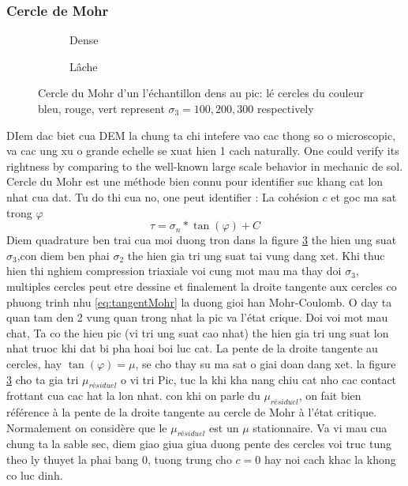 \documentclass[a4paper,12pt]{report}
\begin{document}
\subsubsection{Cercle de Mohr}
\begin{figure}[h!]
    \centering
    \begin{subfigure}[b]{0.48\textwidth}
        \centering
        \scalebox{0.6}{\small }
        \caption{Dense}
        \label{fig:palier_a}
    \end{subfigure}
    \hfill
    \begin{subfigure}[b]{0.48\textwidth}
        \centering
        \scalebox{0.7}{\small }
        \caption{Lâche}
        \label{fig:palier_b}
    \end{subfigure}
    \caption{Cercle du Mohr d'un l'échantillon dens au pic: lé cercles du couleur bleu, rouge, vert represent $\sigma_3 = 100, 200, 300$ respectively}
    \label{fig:CercleDuMohr}
\end{figure}
DIem dac biet cua DEM la chung ta chi intefere vao cac thong so o microscopic, va cac ung xu o grande echelle se xuat hien 1 cach naturally.
One could verify its rightness by comparing to the well-known large scale behavior in mechanic de sol.  
Cercle du Mohr est une méthode bien connu pour identifier suc khang cat lon nhat cua dat. Tu do thi cua no, one peut identifier : La cohésion $c$ et goc ma sat trong $\varphi$
\begin{equation}
    \tau = \sigma_n * \tan(\varphi) + C
    \label{eq:tangentMohr}
\end{equation}
Diem quadrature ben trai cua moi duong tron dans la figure \ref{fig:CercleDuMohr} the hien ung suat $\sigma_3$,con diem ben phai $\sigma_2$ the hien gia tri ung suat tai vung dang xet.
Khi thuc hien thi nghiem compression triaxiale voi cung mot mau ma thay doi $\sigma_3$, multiples cercles peut etre dessine et finalement la droite tangente aux cercles co phuong trinh nhu \ref{eq:tangentMohr} la duong gioi han Mohr-Coulomb.
O day ta quan tam den 2 vung quan trong nhat la pic va l'état crique.
Doi voi mot mau chat, Ta co the hieu pic (vi tri ung suat cao nhat) the hien gia tri ung suat lon nhat truoc khi dat bi pha hoai boi luc cat. 
La pente de la droite tangente au cercles, hay $\tan(\varphi) = \mu$, se cho thay su ma sat o giai doan dang xet. 
la figure \ref{fig:CercleDuMohr} cho ta gia tri $\mu_{résiduel}$ o vi tri Pic, tuc la khi kha nang chiu cat nho cac contact frottant cua cac hat la lon nhat.
con khi on parle du  $\mu_{résiduel}$, on fait bien référence à la pente de la droite tangente au cercle de Mohr à l’état critique.
Normalement on considère que le $\mu_{résiduel}$ est un $\mu$ stationnaire. 
Va vi mau cua chung ta la sable sec, diem giao giua giua duong pente des cercles voi truc tung theo ly thuyet la phai bang 0, tuong trung cho $c = 0$ hay noi cach khac la khong co luc dinh.
\end{document}
